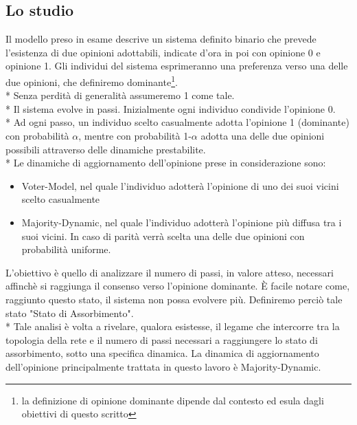 \documentclass{article}
\begin{document}
\subsection{Lo studio}
Il modello preso in esame descrive un sistema definito binario che prevede l'esistenza di due opinioni adottabili, indicate d'ora in poi con opinione 0 e opinione 1. Gli individui del sistema esprimeranno una preferenza verso una delle due opinioni, che definiremo  dominante\footnote{la definizione di opinione dominante dipende dal contesto ed esula dagli obiettivi di questo scritto}.\\*
Senza perdità di generalità assumeremo 1 come tale.\\*
Il sistema evolve in passi. Inizialmente ogni individuo condivide l'opinione 0.\\*
Ad ogni passo, un individuo scelto casualmente adotta l'opinione 1 (dominante) con probabilità $\alpha$, mentre con probabilità 1-$\alpha$ adotta una delle due opinioni possibili attraverso delle dinamiche prestabilite.\\*
Le dinamiche di aggiornamento dell'opinione prese in considerazione sono:
\begin{itemize}
\item Voter-Model, nel quale l'individuo adotterà l'opinione di uno dei suoi vicini scelto casualmente
\item Majority-Dynamic, nel quale l'individuo adotterà l'opinione più diffusa tra i suoi vicini. In caso di parità verrà scelta una delle due opinioni con probabilità uniforme.
\end{itemize}
L'obiettivo è quello di analizzare il numero di passi, in valore atteso, necessari affinchè si raggiunga il consenso verso l'opinione dominante. È facile notare come, raggiunto questo stato, il sistema non possa evolvere più. Definiremo perciò tale stato "Stato di Assorbimento".\\*
Tale analisi è volta a rivelare, qualora esistesse, il legame che intercorre tra la topologia della rete e il numero di passi necessari a raggiungere lo stato di assorbimento, sotto una specifica dinamica.
La dinamica di aggiornamento dell'opinione principalmente trattata in questo lavoro è Majority-Dynamic.
\end{document}
